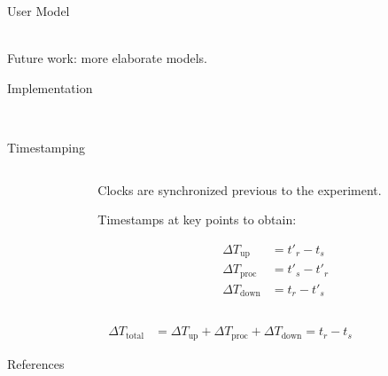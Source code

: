 \documentclass[aspectratio=1610]{beamer}
\begin{document}
\begin{frame}{User Model}
    \begin{center}
        \\
        \vspace{.1\textheight}%
        Future work: more elaborate models.
    \end{center}
\end{frame}

\begin{frame}{Implementation}
    \begin{center}
        \\
        \vspace{.1\textheight}
    \end{center}
\end{frame}

\begin{frame}{Timestamping}
    \begin{columns}[onlytextwidth]
        \begin{column}{.5\linewidth}
            \footnotesize%
            \raggedright%
            
        \end{column}%
        \begin{column}{.5\linewidth}
            Clocks are synchronized previous to the experiment.

            \vspace{\baselineskip}%
            Timestamps at key points to obtain:

            \begin{align}
                {\Delta}T_\text{up}   & = t'_{r} - t_{s}  \\
                {\Delta}T_\text{proc} & = t'_{s} - t'_{r} \\
                {\Delta}T_\text{down} & = t_{r} - t'_{s}
            \end{align}
        \end{column}%
    \end{columns}
    \begin{align}
        {\Delta}T_\text{total} & = {\Delta}T_\text{up} + {\Delta}T_\text{proc} + {\Delta}T_\text{down} = t_{r} - t_{s}
    \end{align}
\end{frame}

\begin{frame}[allowframebreaks, t]{References}
    \nocite{*}
    \printbibliography%
\end{frame}
\end{document}

